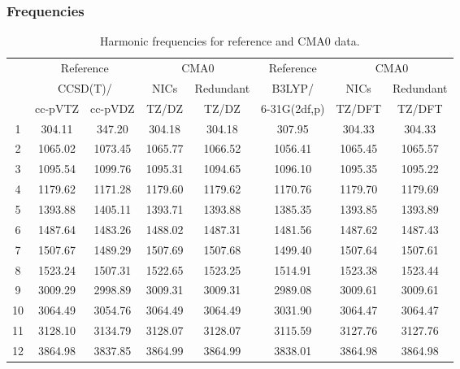 \documentclass[10pt,oneside]{article}
\begin{document}
\begin{table}[h!]
\subsubsection*{Frequencies}
\centering
\caption{Harmonic frequencies for reference and CMA0 data.}
\begin{tabular}{cccccccc}
\toprule
{} & \multicolumn{2}{c}{Reference} & \multicolumn{2}{c}{CMA0} &    Reference & \multicolumn{2}{c}{CMA0} \\
{} & \multicolumn{2}{c}{CCSD(T)/} &    NICs &  Redundant &       B3LYP/ &    NICs & Redundant \\
{} &   cc-pVTZ & cc-pVDZ &   TZ/DZ &      TZ/DZ & 6-31G(2df,p) &  TZ/DFT &    TZ/DFT \\
\midrule
1  &    304.11 &  347.20 &  304.18 &     304.18 &       307.95 &  304.33 &    304.33 \\
2  &   1065.02 & 1073.45 & 1065.77 &    1066.52 &      1056.41 & 1065.45 &   1065.57 \\
3  &   1095.54 & 1099.76 & 1095.31 &    1094.65 &      1096.10 & 1095.35 &   1095.22 \\
4  &   1179.62 & 1171.28 & 1179.60 &    1179.62 &      1170.76 & 1179.70 &   1179.69 \\
5  &   1393.88 & 1405.11 & 1393.71 &    1393.88 &      1385.35 & 1393.85 &   1393.89 \\
6  &   1487.64 & 1483.26 & 1488.02 &    1487.31 &      1481.56 & 1487.62 &   1487.43 \\
7  &   1507.67 & 1489.29 & 1507.69 &    1507.68 &      1499.40 & 1507.64 &   1507.61 \\
8  &   1523.24 & 1507.31 & 1522.65 &    1523.25 &      1514.91 & 1523.38 &   1523.44 \\
9  &   3009.29 & 2998.89 & 3009.31 &    3009.31 &      2989.08 & 3009.61 &   3009.61 \\
10 &   3064.49 & 3054.76 & 3064.49 &    3064.49 &      3031.90 & 3064.47 &   3064.47 \\
11 &   3128.10 & 3134.79 & 3128.07 &    3128.07 &      3115.59 & 3127.76 &   3127.76 \\
12 &   3864.98 & 3837.85 & 3864.99 &    3864.99 &      3838.01 & 3864.98 &   3864.98 \\
\bottomrule
\end{tabular}
\end{table}
\end{document}
